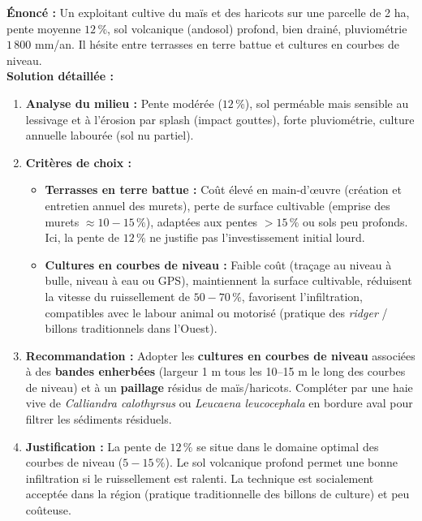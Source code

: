 \documentclass[11pt]{article}
\begin{document}
\begin{exoresolu}
\textbf{Énoncé :} Un exploitant cultive du maïs et des haricots sur une parcelle de 2 ha, pente moyenne $12\,\%$, sol volcanique (andosol) profond, bien drainé, pluviométrie $1\,800$ mm/an. Il hésite entre terrasses en terre battue et cultures en courbes de niveau.\\
\textbf{Solution détaillée :}
\begin{enumerate}
\item \textbf{Analyse du milieu :} Pente modérée ($12\,\%$), sol perméable mais sensible au lessivage et à l'érosion par splash (impact gouttes), forte pluviométrie, culture annuelle labourée (sol nu partiel).
\item \textbf{Critères de choix :}
\begin{itemize}
\item \textbf{Terrasses en terre battue :} Coût élevé en main-d'œuvre (création et entretien annuel des murets), perte de surface cultivable (emprise des murets $\approx 10-15\,\%$), adaptées aux pentes $> 15\,\%$ ou sols peu profonds. Ici, la pente de $12\,\%$ ne justifie pas l'investissement initial lourd.
\item \textbf{Cultures en courbes de niveau :} Faible coût (traçage au niveau à bulle, niveau à eau ou GPS), maintiennent la surface cultivable, réduisent la vitesse du ruissellement de $50-70\,\%$, favorisent l'infiltration, compatibles avec le labour animal ou motorisé (pratique des \emph{ridger} / billons traditionnels dans l'Ouest).
\end{itemize}
\item \textbf{Recommandation :} Adopter les \textbf{cultures en courbes de niveau} associées à des \textbf{bandes enherbées} (largeur 1 m tous les 10–15 m le long des courbes de niveau) et à un \textbf{paillage} résidus de maïs/haricots. Compléter par une haie vive de \emph{Calliandra calothyrsus} ou \emph{Leucaena leucocephala} en bordure aval pour filtrer les sédiments résiduels.
\item \textbf{Justification :} La pente de $12\,\%$ se situe dans le domaine optimal des courbes de niveau ($5-15\,\%$). Le sol volcanique profond permet une bonne infiltration si le ruissellement est ralenti. La technique est socialement acceptée dans la région (pratique traditionnelle des billons de culture) et peu coûteuse.
\end{enumerate}
\end{exoresolu}
\end{document}
